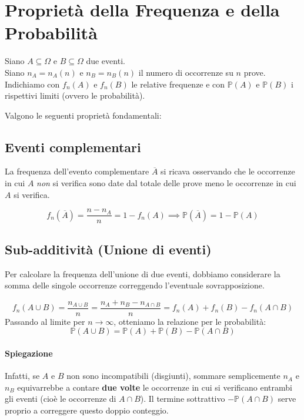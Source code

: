 \section{Proprietà della Frequenza e della Probabilità}

Siano $A \subseteq \Omega$ e $B \subseteq \Omega$ due eventi.
\\Siano $n_A = n_A(n)$ e $n_B = n_B(n)$ il numero di occorrenze su $n$ prove.
\\Indichiamo con $f_n(A)$ e $f_n(B)$ le relative frequenze e con $\mathbb{P}(A)$ e $\mathbb{P}(B)$ i rispettivi limiti (ovvero le probabilità).

Valgono le seguenti proprietà fondamentali:

\subsection{Eventi complementari}
La frequenza dell'evento complementare $\overline{A}$ si ricava osservando che le occorrenze in cui $A$ \emph{non} si verifica sono date dal totale delle prove meno le occorrenze in cui $A$ si verifica.

\[
f_n(\overline{A}) = \frac{n - n_A}{n} = 1 - f_n(A) \implies \mathbb{P}(\overline{A}) = 1 - \mathbb{P}(A)
\]

\subsection{Sub-additività (Unione di eventi)}
Per calcolare la frequenza dell'unione di due eventi, dobbiamo considerare la somma delle singole occorrenze correggendo l'eventuale sovrapposizione.

\[
f_n(A \cup B) = \frac{n_{A \cup B}}{n} = \frac{n_A + n_B - n_{A \cap B}}{n} = f_n(A) + f_n(B) - f_n(A \cap B)
\]
Passando al limite per $n \to \infty$, otteniamo la relazione per le probabilità:
\[
\mathbb{P}(A \cup B) = \mathbb{P}(A) + \mathbb{P}(B) - \mathbb{P}(A \cap B)
\]

\paragraph{Spiegazione}
Infatti, se $A$ e $B$ non sono incompatibili (disgiunti), sommare semplicemente $n_A$ e $n_B$ equivarrebbe a contare \textbf{due volte} le occorrenze in cui si verificano entrambi gli eventi (cioè le occorrenze di $A \cap B$). Il termine sottrattivo $-\mathbb{P}(A \cap B)$ serve proprio a correggere questo doppio conteggio.

